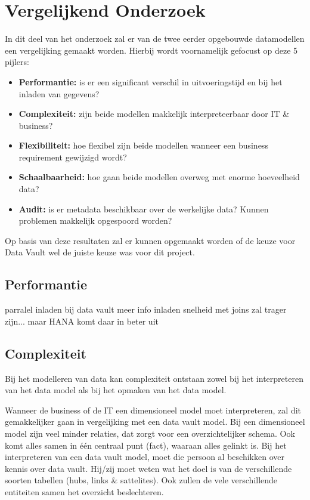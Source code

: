 
\chapter{Vergelijkend Onderzoek}
\label{ch:vergelijkendonderzoek}
In dit deel van het onderzoek zal er van de twee eerder opgebouwde datamodellen een vergelijking gemaakt worden. Hierbij wordt voornamelijk gefocust op deze 5 pijlers:

\begin{itemize}
	\item \textbf{Performantie:} is er een significant verschil in uitvoeringstijd en bij het inladen van gegevens?
	\item \textbf{Complexiteit:} zijn beide modellen makkelijk interpreteerbaar door IT \& business?
	\item \textbf{Flexibiliteit:} hoe flexibel zijn beide modellen wanneer een business requirement gewijzigd wordt?
	\item \textbf{Schaalbaarheid:} hoe gaan beide modellen overweg met enorme hoeveelheid data?
	\item \textbf{Audit:} is er metadata beschikbaar over de werkelijke data? Kunnen problemen makkelijk opgespoord worden?
\end{itemize} 

Op basis van deze resultaten zal er kunnen opgemaakt worden of de keuze voor Data Vault wel de juiste keuze was voor dit project.

\section{Performantie}
parralel inladen bij data vault
meer info inladen
snelheid met joins zal trager zijn... maar HANA komt daar in beter uit

\section{Complexiteit}
Bij het modelleren van data kan complexiteit ontstaan zowel bij het interpreteren van het data model als bij het opmaken van het data model. 

Wanneer de business of de IT een dimensioneel model moet interpreteren, zal dit gemakkelijker gaan in vergelijking met een data vault model. Bij een dimensioneel model zijn veel minder relaties, dat zorgt voor een overzichtelijker schema. Ook komt alles samen in één centraal punt (fact), waaraan alles gelinkt is. Bij het interpreteren van een data vault model, moet die persoon al beschikken over kennis over data vault. Hij/zij moet weten wat het doel is van de verschillende soorten tabellen (hubs, links \& sattelites). Ook zullen de vele verschillende entiteiten samen het overzicht beslechteren. 

